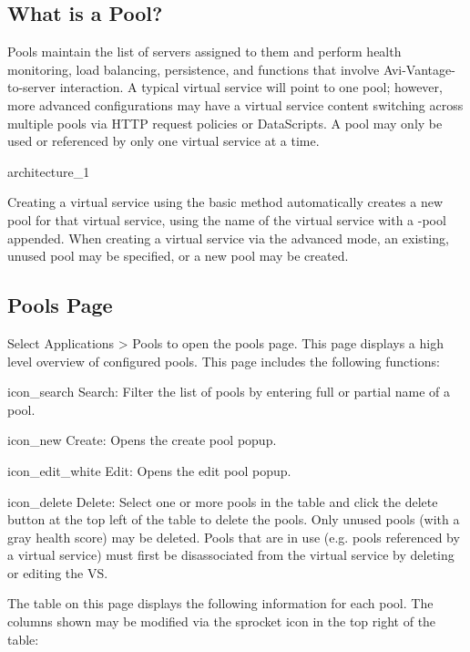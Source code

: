 \documentclass[letterpaper,10pt,english]{sphinxmanual}
\begin{document}
\subsection{What is a Pool?}
\label{\detokenize{getting_started/pool:what-is-a-pool}}
Pools maintain the list of servers assigned to them and perform health monitoring, load balancing, persistence, and functions that involve Avi-Vantage-to-server interaction. A typical virtual service will point to one pool; however, more advanced configurations may have a virtual service content switching across multiple pools via HTTP request policies or DataScripts. A pool may only be used or referenced by only one virtual service at a time.

architecture\_1

Creating a virtual service using the basic method automatically creates a new pool for that virtual service, using the name of the virtual service with a -pool appended. When creating a virtual service via the advanced mode, an existing, unused pool may be specified, or a new pool may be created.


\subsection{Pools Page}
\label{\detokenize{getting_started/pool:pools-page}}
Select Applications \textgreater{} Pools to open the pools page. This page displays a high level overview of configured pools. This page includes the following functions:

icon\_search Search: Filter the list of pools by entering full or partial name of a pool.

icon\_new Create: Opens the create pool popup.

icon\_edit\_white Edit: Opens the edit pool popup.

icon\_delete Delete: Select one or more pools in the table and click the delete button at the top left of the table to delete the pools. Only unused pools (with a gray health score) may be deleted. Pools that are in use (e.g. pools referenced by a virtual service) must first be disassociated from the virtual service by deleting or editing the VS.

The table on this page displays the following information for each pool. The columns shown may be modified via the sprocket icon in the top right of the table:
\end{document}
